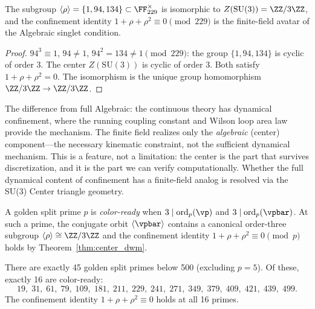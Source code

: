 \begin{theorem}[Center Realization at $p = 229$]\label{thm:center_229}
The subgroup $\langle \rho \rangle = \{1, 94, 134\} \subset \FF_{229}^\times$ is isomorphic to $Z(\mathrm{SU}(3)) = \ZZ/3\ZZ$, and the confinement identity $1 + \rho + \rho^2 \equiv 0 \pmod{229}$ is the finite-field avatar of the Algebraic singlet condition.
\end{theorem}

\begin{proof}
$94^3 \equiv 1$, $94 \neq 1$, $94^2 = 134 \neq 1 \pmod{229}$: the group $\{1, 94, 134\}$ is cyclic of order 3. The center $Z(\mathrm{SU}(3))$ is cyclic of order 3. Both satisfy $1 + \rho + \rho^2 = 0$. The isomorphism is the unique group homomorphism $\ZZ/3\ZZ \to \ZZ/3\ZZ$. \qedhere
\end{proof}

The difference from full Algebraic: the continuous theory has dynamical confinement, where the running coupling constant and Wilson loop area law provide the mechanism. The finite field realizes only the \emph{algebraic} (center) component---the necessary kinematic constraint, not the sufficient dynamical mechanism. This is a feature, not a limitation: the center is the part that survives discretization, and it is the part we can verify computationally. Whether the full dynamical content of confinement has a finite-field analog is resolved via the SU(3) Center triangle geometry.

\begin{definition}\label{def:colorready}
A golden split prime $p$ is \emph{color-ready} when $3 \mid \mathrm{ord}_p(\vp)$ and $3 \mid \mathrm{ord}_p(\vpbar)$. At such a prime, the conjugate orbit $\langle \vpbar \rangle$ contains a canonical order-three subgroup $\langle \rho \rangle \cong \ZZ/3\ZZ$ and the confinement identity $1 + \rho + \rho^2 \equiv 0 \pmod{p}$ holds by Theorem~\ref{thm:center_dwm}.
\end{definition}

\begin{proposition}\label{prop:survey}
There are exactly 45 golden split primes below 500 (excluding $p = 5$). Of these, exactly 16 are color-ready:
\[
19,\; 31,\; 61,\; 79,\; 109,\; 181,\; 211,\; 229,\; 241,\; 271,\; 349,\; 379,\; 409,\; 421,\; 439,\; 499.
\]
The confinement identity $1 + \rho + \rho^2 \equiv 0$ holds at all 16 primes.
\end{proposition}

